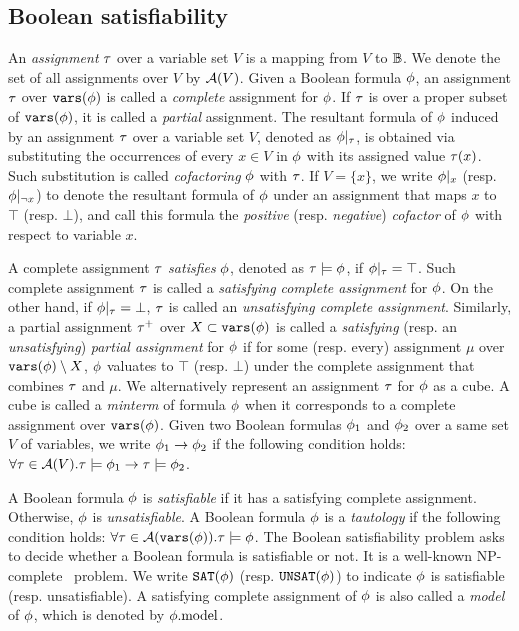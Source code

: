 \subsection{Boolean satisfiability}
An \textit{assignment} $\tau$ over a variable set $V$ is a mapping from $V$ to $\mathbb{B}$.
We denote the set of all assignments over $V$ by $\mathcal{A}(V)$.
Given a Boolean formula $\phi$,
an assignment $\tau$ over $\texttt{vars}(\phi)$ is called a \textit{complete} assignment for $\phi$.
If $\tau$ is over a proper subset of $\texttt{vars}(\phi)$, it is called a \textit{partial} assignment.
The resultant formula of $\phi$ induced by an assignment $\tau$ over a variable set $V$,
denoted as $\phi|_{\tau}$,
is obtained via substituting the occurrences of every $x\in V$ in $\phi$ with its assigned value $\tau(x)$.
Such substitution is called \textit{cofactoring} $\phi$ with $\tau$.
If $V=\{x\}$, we write $\phi|_{x}$ (resp. $\phi|_{\lnot x}$) to denote the resultant formula of $\phi$ under an assignment that maps $x$ to $\top$ (resp. $\bot$),
and call this formula the \textit{positive} (resp. \textit{negative}) \textit{cofactor} of $\phi$ with respect to variable $x$.

A complete assignment $\tau$ \textit{satisfies} $\phi$, denoted as $\tau\models\phi$, if $\phi|_{\tau}=\top$.
Such complete assignment $\tau$ is called a \textit{satisfying complete assignment} for $\phi$.
On the other hand, if $\phi|_{\tau}=\bot$, $\tau$ is called an \textit{unsatisfying complete assignment}.
Similarly, a partial assignment $\tau^+$ over $X\subset\texttt{vars}(\phi)$ is called a \textit{satisfying} (resp. an \textit{unsatisfying}) \textit{partial assignment} for $\phi$
if for some (resp. every) assignment $\mu$ over $\texttt{vars}(\phi)\setminus X$,
$\phi$ valuates to $\top$ (resp. $\bot$) under the complete assignment that combines $\tau$ and $\mu$.
We alternatively represent an assignment $\tau$ for $\phi$ as a cube.
A cube is called a \textit{minterm} of formula $\phi$ when it corresponds to a complete assignment over $\texttt{vars}(\phi)$.
Given two Boolean formulas $\phi_1$ and $\phi_2$ over a same set $V$ of variables,
we write $\phi_1\rightarrow\phi_2$ if the following condition holds:
$\forall\tau\in\mathcal{A}(V).\tau\models\phi_1\rightarrow\tau\models\phi_2$.

A Boolean formula $\phi$ is \textit{satisfiable} if it has a satisfying complete assignment.
Otherwise, $\phi$ is \textit{unsatisfiable}.
A Boolean formula $\phi$ is a \textit{tautology} if the following condition holds:
$\forall\tau\in\mathcal{A}(\texttt{vars}(\phi)).\tau\models\phi$.
The Boolean satisfiability problem asks to decide whether a Boolean formula is satisfiable or not.
It is a well-known NP-complete~\cite{Cook1971} problem.
We write $\texttt{SAT}(\phi)$ (resp. $\texttt{UNSAT}(\phi)$) to indicate $\phi$ is satisfiable (resp. unsatisfiable).
A satisfying complete assignment of $\phi$ is also called a \textit{model} of $\phi$, which is denoted by $\phi.\mathrm{model}$.

